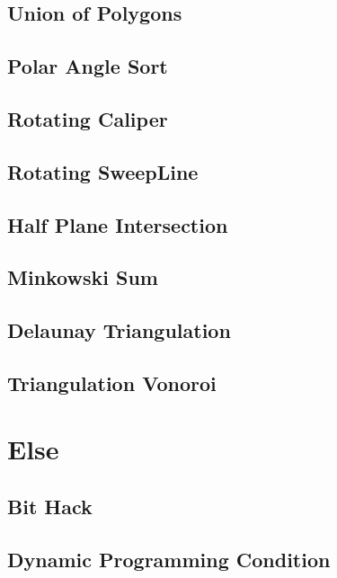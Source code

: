 \subsection{Union of Polygons}

\subsection{Polar Angle Sort}

\subsection{Rotating Caliper}

\subsection{Rotating SweepLine}

\subsection{Half Plane Intersection}

\subsection{Minkowski Sum}

\subsection{Delaunay Triangulation}

\subsection{Triangulation Vonoroi}


\section{Else}
\subsection{Bit Hack}

\subsection{Dynamic Programming Condition}

